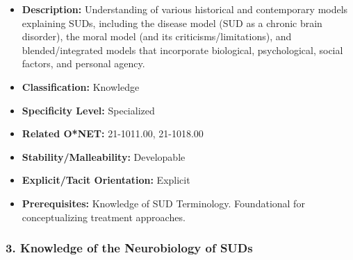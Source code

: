 \documentclass[
  letterpaper,
  DIV=11,
  numbers=noendperiod]{scrartcl}
\providecommand{\tightlist}{%
  \setlength{\itemsep}{0pt}\setlength{\parskip}{0pt}}
\begin{document}
\begin{itemize}
\tightlist
\item
  \textbf{Description:} Understanding of various historical and
  contemporary models explaining SUDs, including the disease model (SUD
  as a chronic brain disorder), the moral model (and its
  criticisms/limitations), and blended/integrated models that
  incorporate biological, psychological, social factors, and personal
  agency.
\item
  \textbf{Classification:} Knowledge
\item
  \textbf{Specificity Level:} Specialized
\item
  \textbf{Related O*NET:} 21-1011.00, 21-1018.00
\item
  \textbf{Stability/Malleability:} Developable
\item
  \textbf{Explicit/Tacit Orientation:} Explicit
\item
  \textbf{Prerequisites:} Knowledge of SUD Terminology. Foundational for
  conceptualizing treatment approaches.
\end{itemize}

\subsubsection{3. Knowledge of the Neurobiology of
SUDs}\label{knowledge-of-the-neurobiology-of-suds}
\end{document}
